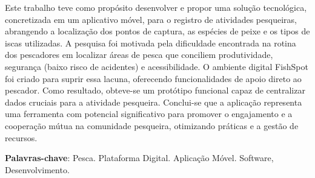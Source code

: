 
\begin{resumo}[RESUMO]
\begin{SingleSpacing}

Este trabalho teve como propósito desenvolver e propor uma solução tecnológica, concretizada em um aplicativo móvel, para o registro de atividades pesqueiras, abrangendo a localização dos pontos de captura, as espécies de peixe e os tipos de iscas utilizadas. A pesquisa foi motivada pela dificuldade encontrada na rotina dos pescadores em localizar áreas de pesca que conciliem produtividade, segurança (baixo risco de acidentes) e acessibilidade. O ambiente digital FishSpot foi criado para suprir essa lacuna, oferecendo funcionalidades de apoio direto ao pescador. Como resultado, obteve-se um protótipo funcional capaz de centralizar dados cruciais para a atividade pesqueira. Conclui-se que a aplicação representa uma ferramenta com potencial significativo para promover o engajamento e a cooperação mútua na comunidade pesqueira, otimizando práticas e a gestão de recursos. 

\hfill \break
\textbf{Palavras-chave}: Pesca. Plataforma Digital. Aplicação Móvel. Software, Desenvolvimento.

\end{SingleSpacing}
\end{resumo}

